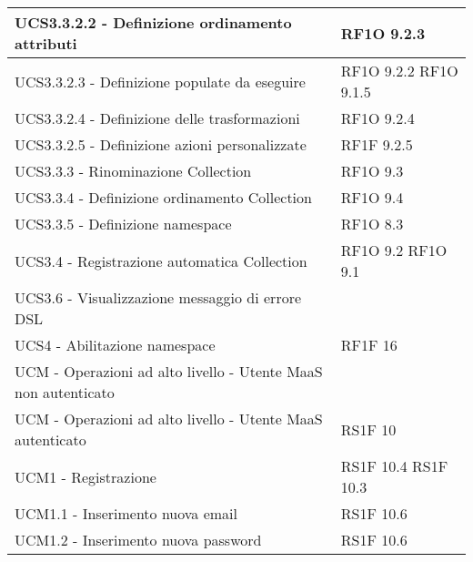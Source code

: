 \begin{center}
\begin{longtable}{ | p{5cm} | p{5cm} |}
            UCS3.3.2.2 - Definizione ordinamento attributi &  RF1O 9.2.3 \newline  \\ \hline      
            UCS3.3.2.3 - Definizione populate da eseguire &  RF1O 9.2.2  \newline  RF1O 9.1.5 \newline  \\ \hline      
            UCS3.3.2.4 - Definizione delle trasformazioni &  RF1O 9.2.4 \newline  \\ \hline      
            UCS3.3.2.5 - Definizione azioni personalizzate &  RF1F 9.2.5 \newline  \\ \hline      
            UCS3.3.3 - Rinominazione Collection &  RF1O 9.3 \newline  \\ \hline      
            UCS3.3.4 - Definizione ordinamento Collection &  RF1O 9.4 \newline  \\ \hline      
            UCS3.3.5 - Definizione namespace &  RF1O 8.3 \newline  \\ \hline      
            UCS3.4 - Registrazione automatica Collection &  RF1O 9.2 \newline  RF1O 9.1  \newline  \\ \hline      
            UCS3.6 - Visualizzazione messaggio di errore DSL &  \\ \hline      
            UCS4 - Abilitazione namespace &  RF1F 16 \newline  \\ \hline      
            UCM - Operazioni ad alto livello - Utente MaaS non autenticato &  \\ \hline      
            UCM - Operazioni ad alto livello - Utente MaaS autenticato &  RS1F 10 \newline  \\ \hline      
            UCM1 - Registrazione &  RS1F 10.4 \newline  RS1F 10.3 \newline  \\ \hline      
            UCM1.1 - Inserimento nuova email &  RS1F 10.6 \newline  \\ \hline      
            UCM1.2 - Inserimento nuova password &  RS1F 10.6 \newline  \\ \hline      

\end{longtable}
\end{center}
